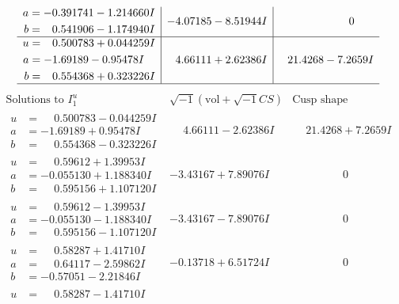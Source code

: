 \documentclass[1p]{elsarticle_modified}
\theoremstyle{definition}
\newcommand{\I}{\sqrt{-1}}
\begin{document}
$$\begin{array}{c|c|c}
\begin{aligned}
a &= -0.391741 - 1.214660 I \\
b &= \phantom{-}0.541906 - 1.174940 I\end{aligned}
 & -4.07185 - 8.51944 I & \phantom{-0.000000 } 0 \\ \hline\begin{aligned}
u &= \phantom{-}0.500783 + 0.044259 I \\
a &= -1.69189 - 0.95478 I \\
b &= \phantom{-}0.554368 + 0.323226 I\end{aligned}
 & \phantom{-}4.66111 + 2.62386 I & \phantom{-}21.4268 - 7.2659 I\\
 \hline 
 \end{array}$$\newpage$$\begin{array}{c|c|c}  
\text{Solutions to }I^u_{1}& \I (\text{vol} + \sqrt{-1}CS) & \text{Cusp shape}\\
 \hline 
\begin{aligned}
u &= \phantom{-}0.500783 - 0.044259 I \\
a &= -1.69189 + 0.95478 I \\
b &= \phantom{-}0.554368 - 0.323226 I\end{aligned}
 & \phantom{-}4.66111 - 2.62386 I & \phantom{-}21.4268 + 7.2659 I \\ \hline\begin{aligned}
u &= \phantom{-}0.59612 + 1.39953 I \\
a &= -0.055130 + 1.188340 I \\
b &= \phantom{-}0.595156 + 1.107120 I\end{aligned}
 & -3.43167 + 7.89076 I & \phantom{-0.000000 } 0 \\ \hline\begin{aligned}
u &= \phantom{-}0.59612 - 1.39953 I \\
a &= -0.055130 - 1.188340 I \\
b &= \phantom{-}0.595156 - 1.107120 I\end{aligned}
 & -3.43167 - 7.89076 I & \phantom{-0.000000 } 0 \\ \hline\begin{aligned}
u &= \phantom{-}0.58287 + 1.41710 I \\
a &= \phantom{-}0.64117 - 2.59862 I \\
b &= -0.57051 - 2.21846 I\end{aligned}
 & -0.13718 + 6.51724 I & \phantom{-0.000000 } 0 \\ \hline\begin{aligned}
u &= \phantom{-}0.58287 - 1.41710 I \\

\end{aligned}
\end{array}$$
\end{document}
